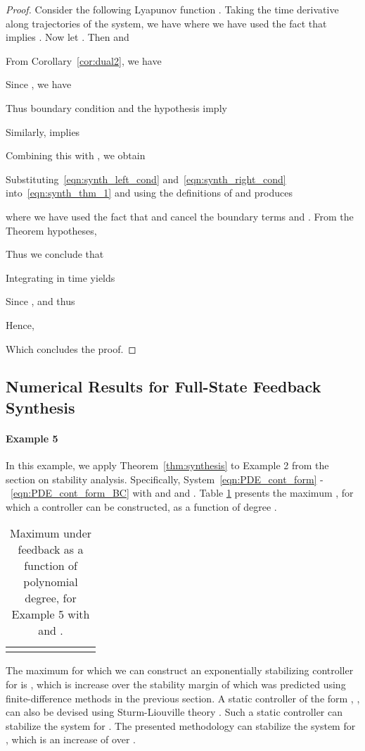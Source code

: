 \documentclass[9pt,journal,twocolumn]{IEEEtran}
\begin{document}
\begin{proof}
Consider the following Lyapunov function . Taking the time derivative along trajectories of the system, we have
 where we have used the fact that  implies .
Now let . Then  and


From Corollary~\ref{cor:dual2}, we have


Since , we have

Thus boundary condition  and the hypothesis  imply


Similarly,  implies



Combining this with , we obtain



Substituting~\eqref{eqn:synth_left_cond} and~\eqref{eqn:synth_right_cond} into~\eqref{eqn:synth_thm_1} and using the definitions of  and  produces

 where we have used the fact that  and  cancel the boundary terms  and .
From the Theorem hypotheses,

Thus we conclude that

Integrating in time yields


Since ,  and thus


Hence,

Which concludes the proof.
 \end{proof}


\subsection{Numerical Results for Full-State Feedback Synthesis}\label{contsynthnum}
\paragraph*{Example 5} In this example, we apply Theorem~\ref{thm:synthesis} to Example 2 from the section on stability analysis. Specifically, System~\eqref{eqn:PDE_cont_form} -~\eqref{eqn:PDE_cont_form_BC} with  and  and . Table \ref{table_synthesis_1} presents the maximum  , for which a controller can be constructed, as a function of degree .
\begin{table}[h]
\begin{center}
    \begin{tabular}{l *{7}{c}}\hline \hline
  &  &  &  &  \\ \hline
 &   &  &  &  \\
\end{tabular}
\end{center}
\caption{Maximum  under feedback as a function of polynomial degree,  for Example 5 with  and .}
\label{table_synthesis_1}
\end{table}The maximum  for which we can construct an exponentially stabilizing controller for is , which is  increase over the stability margin of  which was predicted using finite-difference methods in the previous section. A static controller of the form , , can also be devised using Sturm-Liouville theory \cite[Chapter~5]{egorov1996spectral}. Such a static controller can stabilize the system for . The presented methodology can stabilize the system for , which is an increase of  over . 
\end{document}
